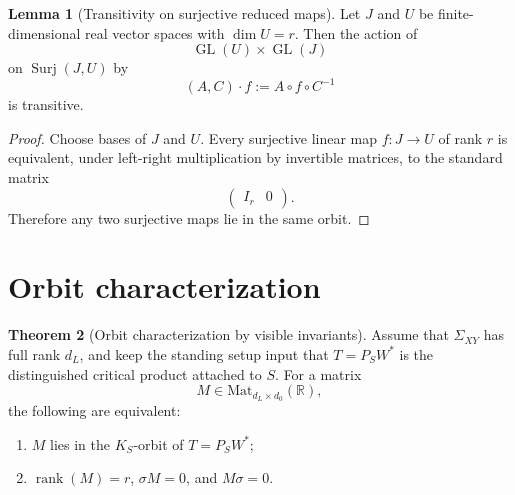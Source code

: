\documentclass{article}
\newcommand{\rk}{\operatorname{rank}}
\newcommand{\GL}{\operatorname{GL}}
\newcommand{\R}{\mathbb{R}}
\newcommand{\Mat}{\mathrm{Mat}}
\theoremstyle{definition}
\newtheorem{theorem}{Theorem}[section]
\newtheorem{lemma}[theorem]{Lemma}
\begin{document}
\begin{lemma}[Transitivity on surjective reduced maps]\label{lem:transitivity-surjective}
Let $J$ and $U$ be finite-dimensional real vector spaces with $\dim U=r$. Then the action of
\[
\GL(U)\times \GL(J)
\]
on $\operatorname{Surj}(J,U)$ by
\[
(A,C)\cdot f:=A\circ f\circ C^{-1}
\]
is transitive.
\end{lemma}

\begin{proof}
Choose bases of $J$ and $U$. Every surjective linear map $f:J\to U$ of rank $r$ is equivalent, under left-right multiplication by invertible matrices, to the standard matrix
\[
\begin{pmatrix} I_r & 0 \end{pmatrix}.
\]
Therefore any two surjective maps lie in the same orbit.
\end{proof}

\section{Orbit characterization}

\begin{theorem}[Orbit characterization by visible invariants]\label{thm:orbit-characterization}
Assume that $\Sigma_{XY}$ has full rank $d_L$, and keep the standing setup input
that $T=P_SW^\ast$ is the distinguished critical product attached to $S$. For a matrix
\[
M\in \Mat_{d_L\times d_0}(\R),
\]
the following are equivalent:
\begin{enumerate}
\item $M$ lies in the $K_S$-orbit of $T=P_SW^\ast$;
\item $\rk(M)=r$, $\sigma M=0$, and $M\sigma=0$.
\end{enumerate}
\end{theorem}
\end{document}
